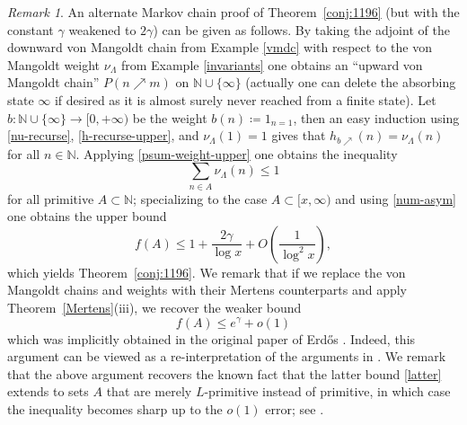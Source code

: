 \documentclass[12pt]{amsart}
\theoremstyle{definition}
\theoremstyle{remark}
\newtheorem{remark}[theorem]{Remark}
\numberwithin{equation}{section}
\newcommand{\N}{{\mathbb N}}
\newcommand{\nuMangoldt}{\nu_{\Lambda}}
\newcommand{\1}{{\mathbf 1}}
\newcommand{\Erdos}{{Erd\H{o}s}}
\begin{document}
\begin{remark}\label{1196-alt-rem} An alternate Markov chain proof of Theorem~\ref{conj:1196} (but with the constant $\gamma$ weakened to $2\gamma$) can be given as follows.  By taking the adjoint of the downward von Mangoldt chain from Example \ref{vmdc} with respect to the von Mangoldt weight $\nuMangoldt$ from Example \ref{invariants} one obtains an ``upward von Mangoldt chain'' $P(n \nearrow m)$ on $\N \cup \{\infty\}$ (actually one can delete the absorbing state $\infty$ if desired as it is almost surely never reached from a finite state).  Let $b \colon \N \cup \{\infty\} \to [0,+\infty)$ be the weight $b(n) \coloneqq 1_{n=1}$, then an easy induction using \eqref{nu-recurse}, \eqref{h-recurse-upper}, and $\nuMangoldt(1)=1$ gives that $h_{b\nearrow}(n) = \nuMangoldt(n)$ for all $n \in \N$.  Applying \eqref{psum-weight-upper} one obtains the inequality
$$ \sum_{n \in A} \nuMangoldt(n) \leq 1$$
for all primitive $A \subset \N$; specializing to the case $A \subset [x,\infty)$ and using \eqref{num-asym} one obtains the upper bound
$$ f(A) \leq 1 + \frac{2\gamma}{\log x} + O\!\left(\frac1{\log^2 x}\right),$$
which yields Theorem~\ref{conj:1196}.  We remark that if we replace the von Mangoldt chains and weights with their Mertens counterparts and apply Theorem~\ref{Mertens}(iii), we recover the weaker bound
\begin{equation}\label{latter}
f(A) \leq e^\gamma + o(1)
\end{equation}
which was implicitly obtained in the original paper of \Erdos{} \cite{erdos35}.  Indeed, this argument can be viewed as a re-interpretation of the arguments in \cite{erdos35}.  We remark that the above argument recovers the known fact that the latter bound \eqref{latter} extends to sets $A$ that are merely $L$-primitive instead of primitive, in which case the inequality becomes sharp up to the $o(1)$ error; see \cite[Proposition 5.3]{Lichtman}.
\end{remark}
\end{document}
